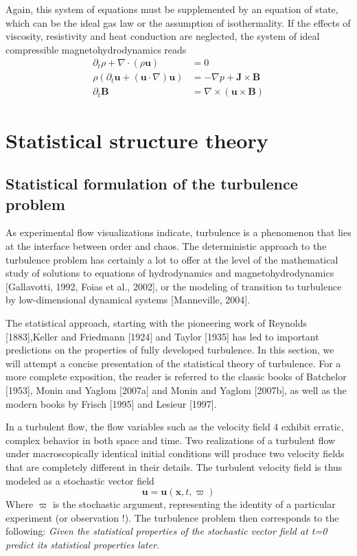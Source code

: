 Again, this system of equations must be supplemented by an equation of state, which can be the ideal gas law or the assumption of isothermality.
If the effects of viscosity, resistivity and heat conduction are neglected, the system of ideal compressible magnetohydrodynamics reads
\begin{align}
    \partial_t\rho+\nabla\cdot(\rho\mathbf{u})&=0\\
    \rho(\partial_t\mathbf{u}+(\mathbf{u}\cdot\nabla)\mathbf{u})&=-\nabla p+\mathbf{J}\times\mathbf{B}\\
    \partial_t\mathbf{B}&=\nabla\times(\mathbf{u}\times\mathbf{B})
\end{align}

\section{Statistical structure theory}
\subsection{Statistical formulation of the turbulence problem}
As experimental flow visualizations indicate, turbulence is a phenomenon that lies at the interface between order and chaos. The deterministic approach to the turbulence problem has certainly a lot to offer at the level of the mathematical study of solutions to equations of hydrodynamics and  magnetohydrodynamics [Gallavotti, 1992, Foias et al., 2002], or the modeling of transition to turbulence by low-dimensional dynamical systems [Manneville, 2004].

The statistical approach, starting with the pioneering work of Reynolds [1883],Keller and Friedmann [1924] and Taylor [1935] has led to important predictions on the properties of fully developed turbulence. In this section, we will attempt a concise presentation of the statistical theory of turbulence. For a more complete exposition, the reader is referred to the classic books of Batchelor [1953], Monin and Yaglom [2007a] and Monin and Yaglom [2007b], as well as the modern books by Frisch [1995] and Lesieur [1997]. 

In a turbulent flow, the flow variables such as the velocity field 4 exhibit erratic, complex behavior in both space and time. Two realizations of a turbulent flow under macroscopically identical initial conditions will produce two velocity fields that are completely different in their details. The turbulent velocity field is thus modeled as a stochastic vector field
\begin{equation}
    \mathbf{u}=\mathbf{u}(\mathbf{x},t,\varpi)
\end{equation}
Where $\varpi$ is the stochastic argument, representing the identity of a particular experiment (or observation !). The turbulence problem then corresponds to the following: \emph{Given the statistical properties of the stochastic vector field at t=0 predict its statistical properties later}. 


